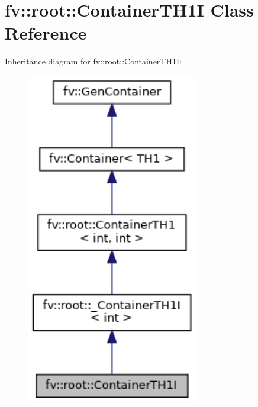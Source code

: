 \hypertarget{classfv_1_1root_1_1ContainerTH1I}{}\section{fv\+:\+:root\+:\+:Container\+T\+H1I Class Reference}
\label{classfv_1_1root_1_1ContainerTH1I}


Inheritance diagram for fv\+:\+:root\+:\+:Container\+T\+H1I\+:
\nopagebreak
\begin{figure}[H]
\begin{center}
\leavevmode
\includegraphics[width=212pt]{classfv_1_1root_1_1ContainerTH1I__inherit__graph}
\end{center}
\end{figure}


